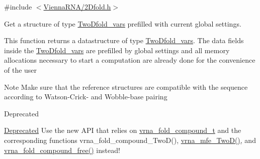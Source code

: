 {\ttfamily \#include $<$\hyperlink{2Dfold_8h}{Vienna\+R\+N\+A/2\+Dfold.\+h}$>$}



Get a structure of type \hyperlink{group__kl__neighborhood__mfe_structTwoDfold__vars}{Two\+Dfold\+\_\+vars} prefilled with current global settings. 

This function returns a datastructure of type \hyperlink{group__kl__neighborhood__mfe_structTwoDfold__vars}{Two\+Dfold\+\_\+vars}. The data fields inside the \hyperlink{group__kl__neighborhood__mfe_structTwoDfold__vars}{Two\+Dfold\+\_\+vars} are prefilled by global settings and all memory allocations necessary to start a computation are already done for the convenience of the user

\begin{DoxyNote}{Note}
Make sure that the reference structures are compatible with the sequence according to Watson-\/\+Crick-\/ and Wobble-\/base pairing
\end{DoxyNote}
\begin{DoxyRefDesc}{Deprecated}
\item[\hyperlink{deprecated__deprecated000002}{Deprecated}]Use the new A\+P\+I that relies on \hyperlink{group__fold__compound_ga1b0cef17fd40466cef5968eaeeff6166}{vrna\+\_\+fold\+\_\+compound\+\_\+t} and the corresponding functions vrna\+\_\+fold\+\_\+compound\+\_\+\+Two\+D(), \hyperlink{group__kl__neighborhood__mfe_ga243c288b463147352829df04de6a2f77}{vrna\+\_\+mfe\+\_\+\+Two\+D()}, and \hyperlink{group__fold__compound_gadded6039d63f5d6509836e20321534ad}{vrna\+\_\+fold\+\_\+compound\+\_\+free()} instead!\end{DoxyRefDesc}



